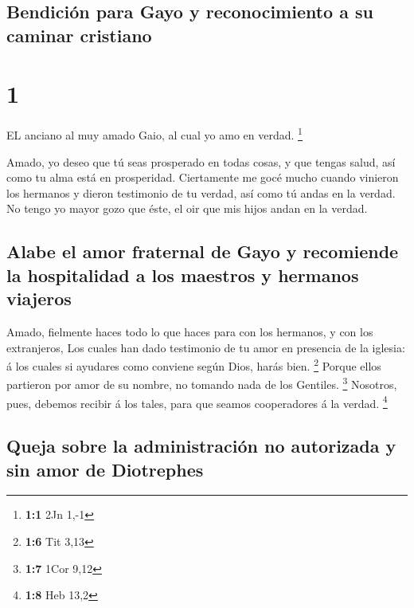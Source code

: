 \hypertarget{bendiciuxf3n-para-gayo-y-reconocimiento-a-su-caminar-cristiano}{%
\subsection{Bendición para Gayo y reconocimiento a su caminar
cristiano}\label{bendiciuxf3n-para-gayo-y-reconocimiento-a-su-caminar-cristiano}}

\hypertarget{section}{%
\section{1}\label{section}}

 EL anciano al muy amado Gaio, al cual yo amo en verdad.
\footnote{\textbf{1:1} 2Jn 1,-1}

 Amado, yo deseo que tú seas prosperado en todas cosas, y
que tengas salud, así como tu alma está en prosperidad. 
Ciertamente me gocé mucho cuando vinieron los hermanos y dieron
testimonio de tu verdad, así como tú andas en la verdad.  No
tengo yo mayor gozo que éste, el oir que mis hijos andan en la verdad.

\hypertarget{alabe-el-amor-fraternal-de-gayo-y-recomiende-la-hospitalidad-a-los-maestros-y-hermanos-viajeros}{%
\subsection{Alabe el amor fraternal de Gayo y recomiende la hospitalidad
a los maestros y hermanos
viajeros}\label{alabe-el-amor-fraternal-de-gayo-y-recomiende-la-hospitalidad-a-los-maestros-y-hermanos-viajeros}}

 Amado, fielmente haces todo lo que haces para con los
hermanos, y con los extranjeros,  Los cuales han dado
testimonio de tu amor en presencia de la iglesia: á los cuales si
ayudares como conviene según Dios, harás bien. \footnote{\textbf{1:6}
  Tit 3,13}  Porque ellos partieron por amor de su nombre,
no tomando nada de los Gentiles. \footnote{\textbf{1:7} 1Cor 9,12}
 Nosotros, pues, debemos recibir á los tales, para que
seamos cooperadores á la verdad. \footnote{\textbf{1:8} Heb 13,2}

\hypertarget{queja-sobre-la-administraciuxf3n-no-autorizada-y-sin-amor-de-diotrephes}{%
\subsection{Queja sobre la administración no autorizada y sin amor de
Diotrephes}\label{queja-sobre-la-administraciuxf3n-no-autorizada-y-sin-amor-de-diotrephes}}

